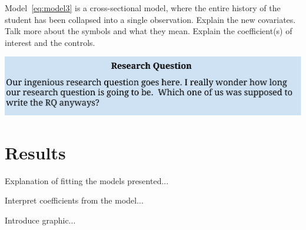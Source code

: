 \documentclass[a0,landscape]{a0poster}
\begin{document}
\begin{multicols}{3}
Model~\ref{eq:model3} is a cross-sectional model, where the
entire history of the student has been collapsed into a
single observation.  Explain the new covariates.
Talk more about the symbols and what they mean.
Explain the coefficient(s) of interest and the controls.


\begin{center}\vspace{1cm}
\includegraphics[width=1.0\linewidth]{ResearchQuestion.pdf}
\end{center}\vspace{1cm}


\color{NavyBlue}

\section*{Results}

Explanation of fitting the models presented...
%
\color{Black}
\begin{center}\vspace{1cm}

\end{center}\vspace{1cm}
\color{NavyBlue}
%   

Interpret coefficients from the model...

\color{NavyBlue}

Introduce graphic...


\end{multicols}
\end{document}
